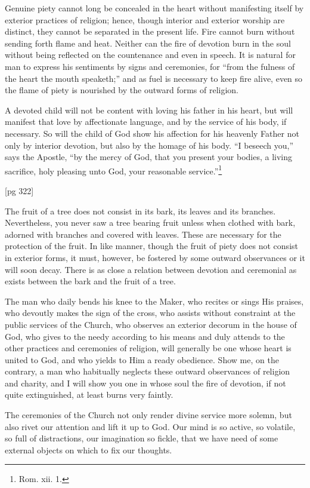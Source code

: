 Genuine piety cannot long be concealed in the
heart without manifesting itself by exterior practices
of religion; hence, though interior and exterior
worship are distinct, they cannot be separated
in the present life. Fire cannot burn without sending
forth flame and heat. Neither can the fire of
devotion burn in the soul without being reflected
on the countenance and even in speech. It is natural
for man to express his sentiments by signs and
ceremonies, for “from the fulness of the heart the
mouth speaketh;” and as fuel is necessary to keep
fire alive, even so the flame of piety is nourished
by the outward forms of religion.

A devoted child will not be content with loving
his father in his heart, but will manifest that love
by affectionate language, and by the service of his
body, if necessary. So will the child of God show
his affection for his heavenly Father not only by
interior devotion, but also by the homage of his
body. “I beseech you,” says the Apostle, “by the
mercy of God, that you present your bodies, a living
sacrifice, holy pleasing unto God, your reasonable
service.”\footnote{Rom. xii. 1.}

[pg 322]

The fruit of a tree does not consist in its bark,
its leaves and its branches. Nevertheless, you
never saw a tree bearing fruit unless when clothed
with bark, adorned with branches and covered
with leaves. These are necessary for the protection
of the fruit. In like manner, though the fruit
of piety does not consist in exterior forms, it must,
however, be fostered by some outward observances
or it will soon decay. There is as close a
relation between devotion and ceremonial as exists
between the bark and the fruit of a tree.

The man who daily bends his knee to the Maker,
who recites or sings His praises, who devoutly
makes the sign of the cross, who assists without
constraint at the public services of the Church,
who observes an exterior decorum in the house of
God, who gives to the needy according to his means
and duly attends to the other practices and ceremonies
of religion, will generally be one whose
heart is united to God, and who yields to Him a
ready obedience. Show me, on the contrary, a man
who habitually neglects these outward observances
of religion and charity, and I will show you one in
whose soul the fire of devotion, if not quite extinguished,
at least burns very faintly.

The ceremonies of the Church not only render
divine service more solemn, but also rivet our attention
and lift it up to God. Our mind is so
active, so volatile, so full of distractions, our imagination
so fickle, that we have need of some
external objects on which to fix our thoughts.

